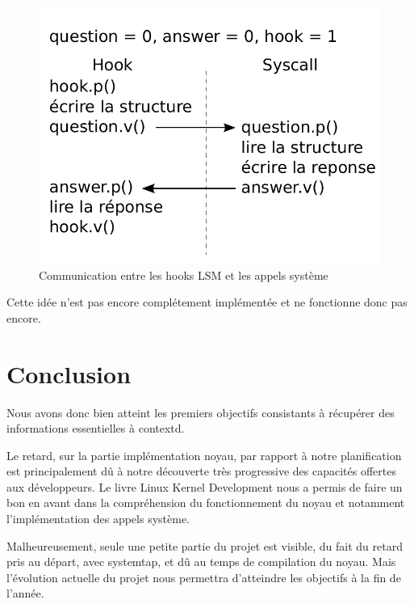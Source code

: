 \documentclass[pdftex,a4paper,titlepage,11pt,openright]{article}
\newcommand{\clearemptydoublepage}{
	\newpage{\pagestyle{empty}\cleardoublepage}}
\begin{document}
\begin{figure}[hb]
	\centering
	\includegraphics{syscall_sync.pdf}
	\caption{Communication entre les hooks LSM et les appels système}
\end{figure}

Cette idée n'est pas encore complétement implémentée et ne fonctionne donc pas encore.

\newpage

\clearemptydoublepage

\section*{Conclusion} 

Nous avons donc bien atteint les premiers objectifs consistants à récupérer des informations essentielles à contextd.

Le retard, sur la partie implémentation noyau, par rapport à notre planification est principalement dû à notre découverte très progressive des capacités offertes aux développeurs. Le livre Linux Kernel Development \cite{LKDSE} nous a permis de faire un bon en avant dans la compréhension du fonctionnement du noyau et notamment l'implémentation des appels système.

Malheureusement, seule une petite partie du projet est visible, du fait du retard pris au départ, avec systemtap, et dû au temps de compilation du noyau. Mais l'évolution actuelle du projet nous permettra d'atteindre les objectifs à la fin de l'année.

\newpage
{}
\end{document}
